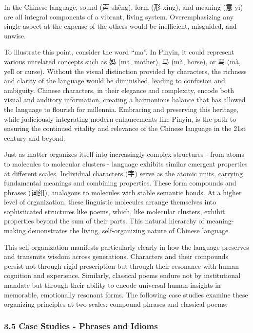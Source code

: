 \documentclass[
]{article}
\begin{document}
In the Chinese language, sound (声 shēng), form (形 xíng), and meaning
(意 yì) are all integral components of a vibrant, living system.
Overemphasizing any single aspect at the expense of the others would be
inefficient, misguided, and unwise.

To illustrate this point, consider the word ``ma''. In Pinyin, it could
represent various unrelated concepts such as 妈 (mā, mother), 马 (mǎ,
horse), or 骂 (mà, yell or curse). Without the visual distinction
provided by characters, the richness and clarity of the language would
be diminished, leading to confusion and ambiguity. Chinese characters,
in their elegance and complexity, encode both visual and auditory
information, creating a harmonious balance that has allowed the language
to flourish for millennia. Embracing and preserving this heritage, while
judiciously integrating modern enhancements like Pinyin, is the path to
ensuring the continued vitality and relevance of the Chinese language in
the 21st century and beyond.

Just as matter organizes itself into increasingly complex structures -
from atoms to molecules to molecular clusters - language exhibits
similar emergent properties at different scales. Individual characters
(字) serve as the atomic units, carrying fundamental meanings and
combining properties. These form compounds and phrases (词组), analogous
to molecules with stable semantic bonds. At a higher level of
organization, these linguistic molecules arrange themselves into
sophisticated structures like poems, which, like molecular clusters,
exhibit properties beyond the sum of their parts. This natural hierarchy
of meaning-making demonstrates the living, self-organizing nature of
Chinese language.

This self-organization manifests particularly clearly in how the
language preserves and transmits wisdom across generations. Characters
and their compounds persist not through rigid prescription but through
their resonance with human cognition and experience. Similarly,
classical poems endure not by institutional mandate but through their
ability to encode universal human insights in memorable, emotionally
resonant forms. The following case studies examine these organizing
principles at two scales: compound phrases and classical poems.

\subsubsection{3.5 Case Studies - Phrases and
Idioms}\label{case-studies---phrases-and-idioms}
\end{document}

